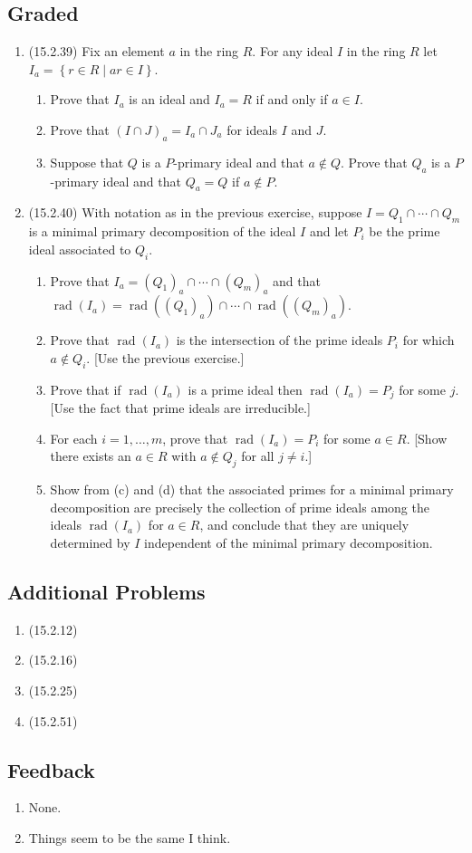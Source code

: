 \documentclass[11pt]{article}
\newcommand{\cbr}[1]{\left\{#1\right\}}
\DeclareMathOperator{\rad}{rad}
\begin{document}
\subsection*{Graded}
\begin{enumerate}
    \item (15.2.39) Fix an element $a$ in the ring $R$. For any ideal $I$ in the ring $R$ let $I_a= \cbr{r\in R\mid ar\in I}$.\begin{enumerate}
        \item Prove that $I_a$ is an ideal and $I_a=R$ if and only if $a\in I$.
        \item Prove that $(I\cap J)_a = I_a\cap J_a$ for ideals $I$ and $J$.
        \item Suppose that $Q$ is a $P$-primary ideal and that $a\not\in Q$. Prove that $Q_a$ is a $P$-primary ideal and that $Q_a=Q$ if $a\not\in P$.
    \end{enumerate}
    \item (15.2.40) With notation as in the previous exercise, suppose $I=Q_1\cap\cdots\cap Q_m$ is a minimal primary decomposition of the ideal $I$ and let $P_i$ be the prime ideal associated to $Q_i$. \begin{enumerate}
        \item Prove that $I_a = (Q_1)_a\cap\cdots\cap (Q_m)_a$ and that $\rad (I_a) = \rad((Q_1)_a)\cap\cdots\cap \rad((Q_m)_a)$.
        \item Prove that $\rad (I_a)$ is the intersection of the prime ideals $P_i$ for which $a\not\in Q_i$. [Use the previous exercise.]
        \item Prove that if $\rad(I_a)$ is a prime ideal then $\rad(I_a) = P_j$ for some $j$. [Use the fact that prime ideals are irreducible.]
        \item For each $i=1,\dots,m$, prove that $\rad(I_a)=P_i$ for some $a\in R$. [Show there exists an $a\in R$ with $a\not\in Q_j$ for all $j\neq i$.]
        \item Show from (c) and (d) that the associated primes for a minimal primary decomposition are precisely the collection of prime ideals among the ideals $\rad(I_a)$ for $a\in R$, and conclude that they are uniquely determined by $I$ independent of the minimal primary decomposition.
    \end{enumerate}
\end{enumerate}
\subsection*{Additional Problems}
\begin{enumerate}
    \item (15.2.12)
    \item (15.2.16)
    \item (15.2.25)
    \item (15.2.51)
\end{enumerate}
\subsection*{Feedback}
\begin{enumerate}
    \item None.
    \item Things seem to be the same I think.
\end{enumerate}
\end{document}
